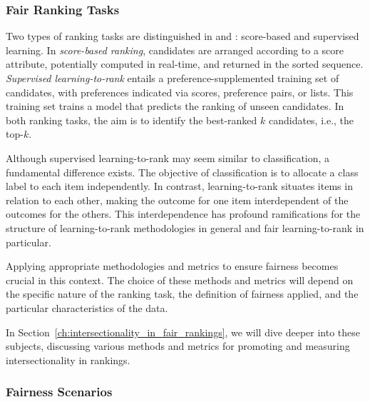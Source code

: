 \subsubsection{Fair Ranking Tasks}
\label{subsec:fairness_rank}


Two types of ranking tasks are distinguished in \cite{zehlike2022fairness1} and \cite{zehlike2022fairness2}: score-based and supervised learning. In \emph{score-based ranking}, candidates are arranged according to a score attribute, potentially computed in real-time, and returned in the sorted sequence. \emph{Supervised learning-to-rank} entails a preference-supplemented training set of candidates, with preferences indicated via scores, preference pairs, or lists. This training set trains a model that predicts the ranking of unseen candidates. In both ranking tasks, the aim is to identify the best-ranked $k$ candidates, i.e., the top-$k$.

Although supervised learning-to-rank may seem similar to classification, a fundamental difference exists. The objective of classification is to allocate a class label to each item independently. In contrast, learning-to-rank situates items in relation to each other, making the outcome for one item interdependent of the outcomes for the others. This interdependence has profound ramifications for the structure of learning-to-rank methodologies in general and fair learning-to-rank in particular.

Applying appropriate methodologies and metrics to ensure fairness becomes crucial in this context. The choice of these methods and metrics will depend on the specific nature of the ranking task, the definition of fairness applied, and the particular characteristics of the data.

In Section~\ref{ch:intersectionality_in_fair_rankings}, we will dive deeper into these subjects, discussing various methods and metrics for promoting and measuring intersectionality in rankings.

\subsubsection{Fairness Scenarios}
\label{subsec:fairness_scenarios}

